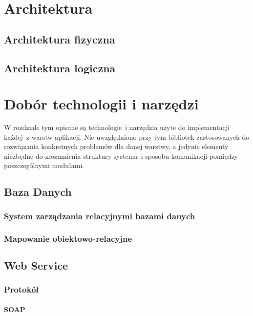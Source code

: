 \documentclass[11pt]{aghdpl}
\begin{document}
\chapter{Architektura}
\label{cha:architektura}

\section{Architektura fizyczna}
\label{sec:architektura_fizyczna}

\section{Architektura logiczna}
\label{sec:architektura_logiczna}


\chapter{Dobór technologii i narzędzi}
\label{cha:dobor_technologii_i_narzedzi}

W rozdziale tym opisane są technologie~i narzędzia użyte do implementacji każdej~z warstw aplikacji. Nie uwzględniono przy tym bibliotek zastosowanych do rozwiązania konkretnych problemów dla danej warstwy, a jedynie elementy niezbędne do zrozumienia struktury systemu~i sposobu komunikacji pomiędzy poszczególnymi modułami.


\section{Baza Danych}
\subsection{System zarządzania relacyjnymi bazami danych}
\subsection{Mapowanie obiektowo-relacyjne}
\section{Web Service}
\subsection{Protokół}
\subsubsection{SOAP}
\end{document}

